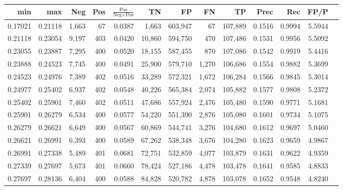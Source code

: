 \begin{tabular}{rrrrrrrrrrrrr}
\toprule
    min &     max &   Neg & Pos & $\frac{\text{Pos}}{\text{Neg}+\text{Pos}}$ &      TN &      FP &      FN &      TP &   Prec &    Rec &   FP/P \\
\midrule
0.17021 & 0.21118 & 1,663 &  67 &                                     0.0387 &   1,663 & 603,947 &      67 & 107,889 & 0.1516 & 0.9994 & 5.5944 \\
0.21118 & 0.23054 & 9,197 & 403 &                                     0.0420 &  10,860 & 594,750 &     470 & 107,486 & 0.1531 & 0.9956 & 5.5092 \\
0.23055 & 0.23887 & 7,295 & 400 &                                     0.0520 &  18,155 & 587,455 &     870 & 107,086 & 0.1542 & 0.9919 & 5.4416 \\
0.23888 & 0.24523 & 7,745 & 400 &                                     0.0491 &  25,900 & 579,710 &   1,270 & 106,686 & 0.1554 & 0.9882 & 5.3699 \\
0.24523 & 0.24976 & 7,389 & 402 &                                     0.0516 &  33,289 & 572,321 &   1,672 & 106,284 & 0.1566 & 0.9845 & 5.3014 \\
0.24977 & 0.25402 & 6,937 & 402 &                                     0.0548 &  40,226 & 565,384 &   2,074 & 105,882 & 0.1577 & 0.9808 & 5.2372 \\
0.25402 & 0.25901 & 7,460 & 402 &                                     0.0511 &  47,686 & 557,924 &   2,476 & 105,480 & 0.1590 & 0.9771 & 5.1681 \\
0.25901 & 0.26279 & 6,534 & 400 &                                     0.0577 &  54,220 & 551,390 &   2,876 & 105,080 & 0.1601 & 0.9734 & 5.1075 \\
0.26279 & 0.26621 & 6,649 & 400 &                                     0.0567 &  60,869 & 544,741 &   3,276 & 104,680 & 0.1612 & 0.9697 & 5.0460 \\
0.26621 & 0.26991 & 6,393 & 400 &                                     0.0589 &  67,262 & 538,348 &   3,676 & 104,280 & 0.1623 & 0.9659 & 4.9867 \\
0.26991 & 0.27338 & 5,489 & 401 &                                     0.0681 &  72,751 & 532,859 &   4,077 & 103,879 & 0.1631 & 0.9622 & 4.9359 \\
0.27339 & 0.27697 & 5,673 & 401 &                                     0.0660 &  78,424 & 527,186 &   4,478 & 103,478 & 0.1641 & 0.9585 & 4.8833 \\
0.27697 & 0.28136 & 6,404 & 400 &                                     0.0588 &  84,828 & 520,782 &   4,878 & 103,078 & 0.1652 & 0.9548 & 4.8240 \\

\end{tabular}
